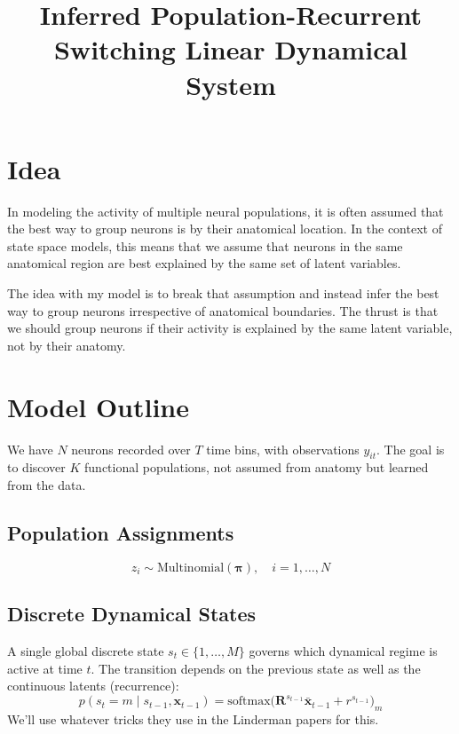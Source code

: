 \documentclass{article}
\title{Inferred Population-Recurrent Switching Linear Dynamical System}
\author{}
\date{}
\begin{document}
\maketitle

\section{Idea}
In modeling the activity of multiple neural populations, it is often assumed that the best way to group neurons is by their anatomical location. In the context of state space models, this means that we assume that neurons in the same anatomical region are best explained by the same set of latent variables.

The idea with my model is to break that assumption and instead infer the best way to group neurons irrespective of anatomical boundaries. The thrust is that we should group neurons if their activity is explained by the same latent variable, not by their anatomy.

\section{Model Outline}
We have \(N\) neurons recorded over \(T\) time bins, with observations \(y_{it}\). The goal is to discover \(K\) functional populations, not assumed from anatomy but learned from the data.

\subsection{Population Assignments}
\begin{equation}
z_i \sim \text{Multinomial}(\boldsymbol{\pi}), \quad i = 1, \dots, N
\end{equation}

\subsection{Discrete Dynamical States}
A single global discrete state \(s_t \in \{1, \dots, M\}\) governs which dynamical regime is active at time \(t\). The transition depends on the previous state as well as the continuous latents (recurrence):
\begin{equation}
p(s_t = m \mid s_{t - 1}, \boldsymbol{x}_{t-1}) = \text{softmax} \bigg(\boldsymbol{R}^{s_{t-1}}\boldsymbol{\bar{x}}_{t-1} + r^{s_{t-1}}\bigg)_m
\end{equation}
We'll use whatever tricks they use in the Linderman papers for this.
\end{document}
